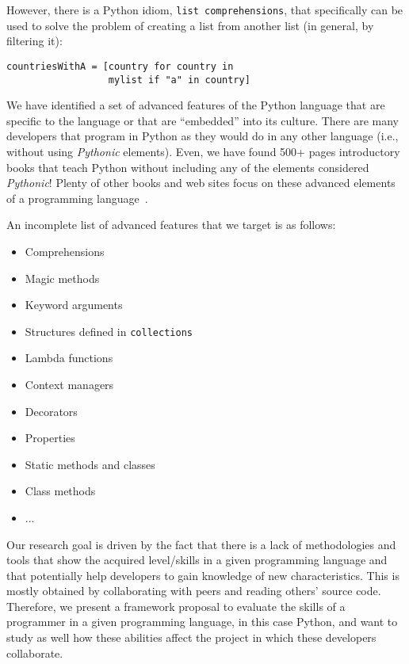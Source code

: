 \documentclass[conference]{IEEEtran}
\begin{document}
However, there is a Python idiom, \texttt{list comprehensions},
that specifically can be used to solve the problem
of creating a list from another list (in general, by filtering it):

\begin{verbatim}
countriesWithA = [country for country in
                  mylist if "a" in country]
\end{verbatim}


We have identified a set of advanced features of the Python language that are specific to the language or that are ``embedded'' into its culture. There are many developers that program in Python as they would do in any other language (i.e., without using \emph{Pythonic} elements). Even, we have found 500+ pages introductory books that teach Python without including any of the elements considered \emph{Pythonic}! Plenty of other books and web sites focus on these advanced elements of a programming language~\cite{martelli2005python}. 


An incomplete list of advanced features that we target is as follows:

\begin{itemize}
  \item Comprehensions
  \item Magic methods
  \item Keyword arguments
  \item Structures defined in \texttt{collections}
  \item Lambda functions
  \item Context managers
  \item Decorators
  \item Properties
  \item Static methods and classes
  \item Class methods
  \item ...
\end{itemize}
  

Our research goal is driven by the fact that there is a lack of methodologies and tools that show the acquired level/skills in a given programming language and that potentially help developers to gain knowledge of new characteristics. This is mostly obtained by collaborating with peers and reading others' source code. Therefore, we present a framework proposal to evaluate the skills of a programmer in a given programming language, in this case Python, and want to study as well how these abilities affect the project in which these developers collaborate.
\end{document}
